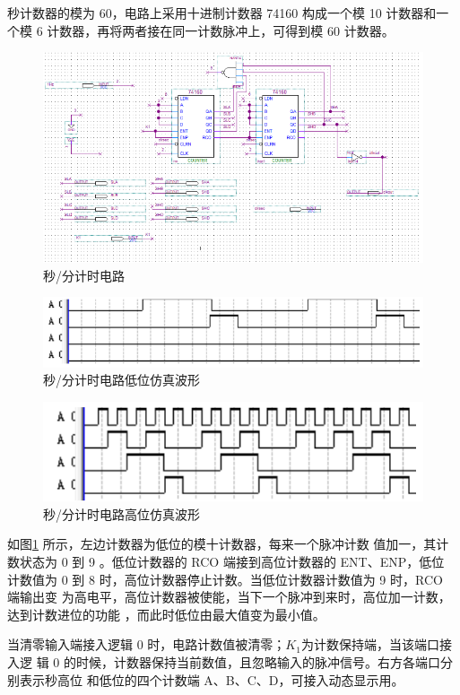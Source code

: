 \documentclass[twoside, openright]{article}
\begin{document}
秒计数器的模为 60，电路上采用十进制计数器 74160 构成一个模 10 计数器和一个模 6
计数器，再将两者接在同一计数脉冲上，可得到模 60 计数器。

\begin{figure}[htbp]
	\centering
	\includegraphics[width = 0.8\linewidth]{sec.png}
	\caption{秒/分计时电路}
	\label{fig:秒/分计时电路}
\end{figure}

\begin{figure}[htbp]
	\centering
	\includegraphics[width = 0.8\linewidth]{sec-1.png}
	\caption{秒/分计时电路低位仿真波形}
	\label{fig:秒/分计时电路低位仿真波形}
\end{figure}

\begin{figure}[htbp]
	\centering
	\includegraphics[width = 0.8\linewidth]{sec-2.png}
	\caption{秒/分计时电路高位仿真波形}
	\label{fig:秒/分计时电路高位仿真波形}
\end{figure}

如图\ref{fig:秒/分计时电路} 所示，左边计数器为低位的模十计数器，每来一个脉冲计数
值加一，其计数状态为 0 到 9 。低位计数器的 RCO 端接到高位计数器的 ENT、ENP，低位
计数值为 0 到 8 时，高位计数器停止计数。当低位计数器计数值为 9 时，RCO 端输出变
为高电平，高位计数器被使能，当下一个脉冲到来时，高位加一计数，达到计数进位的功能
，而此时低位由最大值变为最小值。

当清零输入端接入逻辑 0 时，电路计数值被清零；$ K_1 $为计数保持端，当该端口接入逻
辑 0 的时候，计数器保持当前数值，且忽略输入的脉冲信号。右方各端口分别表示秒高位
和低位的四个计数端 A、B、C、D，可接入动态显示用。
\end{document}
